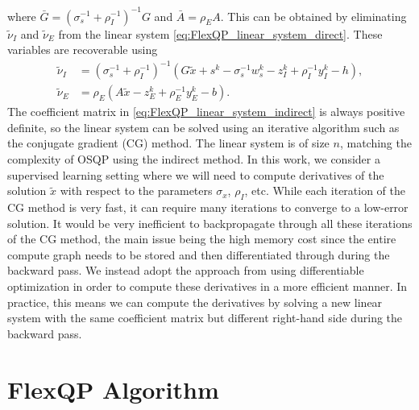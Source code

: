 \documentclass{article} %
\begin{document}
where $\bar{G} = (\sigma_s^{-1} + \rho_I^{-1})^{-1} G$ and $\bar{A} = \rho_E A$.
This can be obtained by eliminating $\tilde{\nu}_I$ and $\tilde{\nu}_E$ from the linear system \cref{eq:FlexQP_linear_system_direct}. These variables are recoverable using
\begin{subequations}
\begin{align}
    \tilde{\nu}_I &= (\sigma_s^{-1} + \rho_I^{-1})^{-1} (G \tilde{x} + s^k - \sigma_s^{-1} w_s^k - z_I^k + \rho_I^{-1} y_I^k - h), \\
    \tilde{\nu}_E &= \rho_E(A\tilde{x} - z_E^k + \rho_E^{-1} y_E^k - b).
\end{align}
\end{subequations}
The coefficient matrix in \cref{eq:FlexQP_linear_system_indirect} is always positive definite, so the linear system can be solved using an iterative algorithm such as the conjugate gradient (CG) method. The linear system is of size $n$, matching the complexity of OSQP using the indirect method. In this work, we consider a supervised learning setting where we will need to compute derivatives of the solution $\tilde{x}$ with respect to the parameters $\sigma_x$, $\rho_I$, etc. While each iteration of the CG method is very fast, it can require many iterations to converge to a low-error solution. It would be very inefficient to backpropagate through all these iterations of the CG method, the main issue being the high memory cost since the entire compute graph needs to be stored and then differentiated through during the backward pass. We instead adopt the approach from \citet[Theorem 2]{saravanos2025deep} using differentiable optimization in order to compute these derivatives in a more efficient manner. In practice, this means we can compute the derivatives by solving a new linear system with the same coefficient matrix but different right-hand side during the backward pass.


\section{FlexQP Algorithm}
\label{appendix:algorithm}
\end{document}
